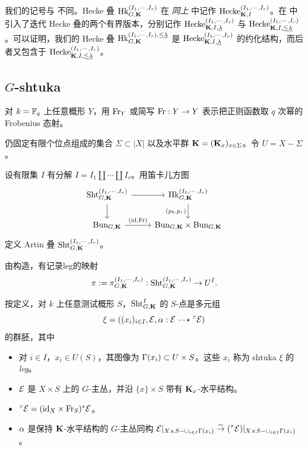 \begin{rmk} 我们的记号与 \cite[\S1]{VLaff} 不同。Hecke 叠 $\textup{Hk}^{(I_{1},\cdots, I_{r})}_{G,\mathbf{K}}$ 在 {\em 同上} 中记作 $\textup{Hecke}_{\mathbf{K},I}^{(I_{1},\cdots, I_{r})}$。在 \cite[定义 1.2]{VLaff} 中引入了迭代 Hecke 叠的两个有界版本，分别记作 $\textup{Hecke}^{(I_{1},\cdots, I_{r})}_{\mathbf{K}, I, \underline{\lambda}}$ 与 $\textup{Hecke}^{(I_{1},\cdots, I_{r})}_{\mathbf{K}, I, \lesssim\underline{\lambda}}$。可以证明，我们的 Hecke 叠 $\textup{Hk}^{(I_{1},\cdots, I_{r}),\le\underline{\lambda}}_{G, \mathbf{K}}$ 是 $\textup{Hecke}^{(I_{1},\cdots, I_{r})}_{\mathbf{K}, I, \underline{\lambda}}$ 的约化结构，而后者又包含于 $\textup{Hecke}^{(I_{1},\cdots, I_{r})}_{\mathbf{K}, I, \lesssim\underline{\lambda}}$。
\end{rmk}

\subsection{$G$-shtuka}\label{ss:Sht}
对 $k=\mathbb{F}_{q}$ 上任意概形 $Y$，用 $\textup{Fr}_{Y}$ 或简写 $\textup{Fr}: Y\to Y$ 表示把正则函数取 $q$ 次幂的 Frobenius 态射。

仍固定有限个位点组成的集合 $\Sigma\subset |X|$ 以及水平群 $\mathbf{K}=(\mathbf{K}_{x})_{x\in \Sigma}$。令 $U=X-\Sigma$。

设有限集 $I$ 有分解 $I=I_{1}\coprod \cdots\coprod I_{r}$。用笛卡儿方图
\begin{equation}\label{defn Sht}
\begin{tikzcd}
\Sht_{G,\bK}^{(I_{1},\cdots, I_{r})} \arrow[r] \arrow[d] & \Hk_{G,\bK}^{(I_{1},\cdots, I_{r})} \arrow[d, "{({p_0},{p_r})}"'] \\
\Bun_{G,\bK} \arrow[r, "{(\id,\Fr)}"] & \Bun_{G,\bK}\times \Bun_{G,\bK}
\end{tikzcd}
\end{equation}
定义 Artin 叠 $\textup{Sht}_{G,\mathbf{K}}^{(I_{1},\cdots, I_{r})}$。

由构造，有记录leg的映射
\begin{equation*}
\pi:=\pi^{(I_{1},\cdots, I_{r})}_{G,\mathbf{K}}: \textup{Sht}_{G,\mathbf{K}}^{(I_{1},\cdots, I_{r})}\to U^{I}.
\end{equation*}


\label{sss:Sht points}
按定义，对 $k$ 上任意测试概形 $S$，$\textup{Sht}_{G,\mathbf{K}}^{I}$ 的 $S$-点是多元组
\begin{equation*}
\xi=((x_{i})_{i\in I}, \mathcal{E}, \alpha: \mathcal{E}\dashrightarrow {}^{\tau}\mathcal{E})
\end{equation*}
的群胚，其中
\begin{itemize}
\item 对 $i\in I$，$x_{i}\in U(S)$，其图像为 $\Gamma(x_{i})\subset U\times S$。这些 $x_{i}$ 称为 shtuka $\xi$ 的 {\em leg}。
\item $\mathcal{E}$ 是 $X\times S$ 上的 $G$-主丛，并沿 $\{x\}\times S$ 带有 $\mathbf{K}_{x}$-水平结构。
\item ${}^{\tau}\mathcal{E}=(\textup{id}_{X}\times \textup{Fr}_{S})^{*}\mathcal{E}$。
\item $\alpha$ 是保持 $\mathbf{K}$-水平结构的 $G$-主丛同构 $\mathcal{E}|_{X\times S-\cup_{i\in I}\Gamma(x_{i})}\stackrel{\sim}{\to} ({}^{\tau}\mathcal{E})|_{X\times S-\cup_{i\in I}\Gamma(x_{i})}$。
\end{itemize}


